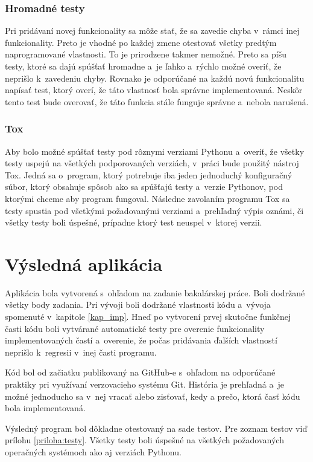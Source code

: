 \subsection{Hromadné testy}
Pri pridávaní novej funkcionality sa môže stať, že sa zavedie chyba v~rámci inej
funkcionality. Preto je vhodné po každej zmene otestovať všetky predtým
naprogramované vlastnosti. To je prirodzene takmer nemožné. Preto sa píšu testy,
ktoré sa dajú spúšťať hromadne a~je ľahko a~rýchlo možné overiť, že neprišlo
k~zavedeniu chyby. Rovnako je odporúčané na každú novú funkcionalitu napísať test, ktorý overí, že táto vlastnosť bola správne implementovaná. Neskôr tento test bude overovať, že táto funkcia stále funguje správne a~nebola narušená.

\subsection{Tox}
\label{sec_tox}
Aby bolo možné spúšťať testy pod rôznymi verziami Pythonu a~overiť, že všetky testy
uspejú na všetkých podporovaných verziách, v~práci bude použitý nástroj Tox.
Jedná sa o~program, ktorý potrebuje iba jeden jednoduchý konfiguračný súbor, ktorý
obsahuje spôsob ako sa spúšťajú testy a~verzie Pythonov, pod ktorými chceme
aby program fungoval. Následne zavolaním programu Tox sa testy
spustia pod všetkými požadovanými verziami a~prehľadný výpis oznámi, či všetky
testy boli úspešné, prípadne ktorý test neuspel v~ktorej verzii.


\chapter{Výsledná aplikácia}
Aplikácia bola vytvorená s~ohľadom na zadanie bakalárskej práce. Boli dodržané všetky body zadania. Pri vývoji boli dodržané vlastnosti kódu a~vývoja spomenuté v~kapitole \ref{kap_imp}. Hneď po vytvorení prvej skutočne funkčnej časti kódu boli vytvárané automatické testy pre overenie  funkcionality implementovaných častí a~overenie, že počas pridávania ďalších vlastností neprišlo k~regresii v~inej časti programu. 

Kód bol od začiatku publikovaný na GitHub-e s~ohľadom na odporúčané praktiky pri využívaní verzovacieho systému Git. História je prehľadná a~je možné jednoducho sa v~nej vracať alebo zisťovať, kedy a prečo, ktorá časť kódu bola implementovaná.

Výsledný program bol dôkladne otestovaný na sade testov. Pre zoznam testov viď prílohu \ref{priloha:testy}. Všetky testy boli úspešné na všetkých požadovaných operačných systémoch ako aj verziách Pythonu.

